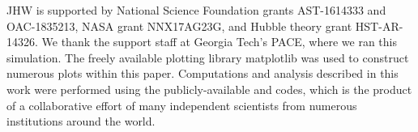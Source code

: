 \documentclass[a4paper,fleqn,usenatbib]{mnras}
\begin{document}
JHW is supported by National Science Foundation grants AST-1614333 and
OAC-1835213, NASA grant NNX17AG23G, and Hubble theory grant
HST-AR-14326.  We thank the support staff at Georgia Tech's PACE,
where we ran this simulation.  The freely available plotting library
{\sc matplotlib} \citep{matplotlib} was used to construct numerous
plots within this paper. Computations and analysis described in this
work were performed using the publicly-available \enzo{} and \yt{}
codes, which is the product of a collaborative effort of many
independent scientists from numerous institutions around the world.










\appendix



\bsp	%
\label{lastpage}
\end{document}
